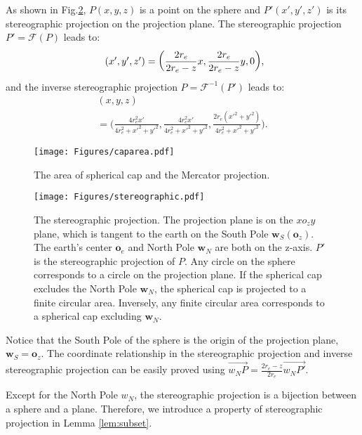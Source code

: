 \documentclass[final]{IEEEtran}
\begin{document}
\begin{theorem}
\label{theo:stereo}
    As shown in Fig.\ref{fig:stereographic}, $P(x,y,z)$ is a point on the sphere and $P'(x',y',z')$ is its stereographic projection on the projection plane. The stereographic projection $P'=\mathcal{F}(P)$ leads to:
\begin{equation}
\begin{array}{r@{}l}
(x',y',z')
=\displaystyle\bigg(\frac{2r_e}{2r_e-z}x,\frac{2r_e}{2r_e-z}y,0\bigg),
\end{array}
\end{equation}
and the inverse stereographic projection $P=\mathcal{F}^{-1}(P')$ leads to:
\begin{equation}
\begin{array}{l}
    (x,y,z)\\=\displaystyle\bigg(\frac{4r_e^2 x'}{4r_e^2+x'^2+y'^2},\frac{4r_e^2 x'}{4r_e^2+x'^2+y'^2},\frac{2r_e(x'^2+y'^2)}{4r_e^2+x'^2+y'^2}\bigg).
\end{array}
\end{equation}
\end{theorem}
\begin{figure}[ht]
    \centering
    \texttt{[image: Figures/caparea.pdf]}
    \caption{The area of spherical cap and the Mercator projection. }
    \label{fig:caparea}
\end{figure}
\begin{figure}
    \centering
    \texttt{[image: Figures/stereographic.pdf]}
    \caption{The stereographic projection. The projection plane is on the $xo_zy$ plane, which is tangent to the earth on the South Pole $\textbf{w}_S(\textbf{o}_z)$. The earth's center $\textbf{o}_e$ and North Pole $\textbf{w}_N$ are both on the z-axis. $P'$ is the stereographic projection of $P$. Any circle on the sphere corresponds to a circle on the projection plane. If the spherical cap excludes the North Pole $\textbf{w}_N$, the spherical cap is projected to a finite circular area. Inversely, any finite circular area corresponds to a spherical cap excluding $\textbf{w}_N$.}
    \label{fig:stereographic}
\end{figure}
\begin{IEEEproof}
    Notice that the South Pole of the sphere is the origin of the projection plane, \ie $\textbf{w}_S=\textbf{o}_{z}$. The coordinate relationship in the stereographic projection and inverse stereographic projection can be easily proved using $\overrightarrow{w_{N}P}=\frac{2r_e-z}{2r_e}\overrightarrow{w_{N}P'}$.  
\end{IEEEproof}
Except for the North Pole $w_N$, the stereographic projection is a bijection between a sphere and a plane. Therefore, we introduce a property of stereographic projection in Lemma \ref{lem:subset}.
\end{document}
